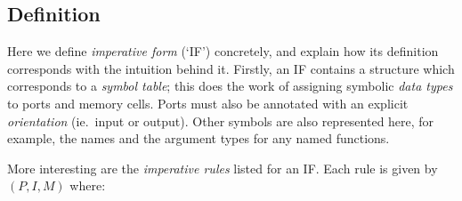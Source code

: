 \subsection{Definition}
\label{sec:imperative_form_definition}
Here we define \textit{imperative form} (`IF') concretely, and explain how its definition corresponds with the intuition behind it. Firstly, an IF contains a structure which corresponds to a \textit{symbol table}; this does the work of assigning symbolic \textit{data types} to ports and memory cells. Ports must also be annotated with an explicit \textit{orientation} (ie.\ input or output). Other symbols are also represented here, for example, the names and the argument types for any named functions.

More interesting are the \textit{imperative rules} listed for an IF. Each rule is given by $(P,I,M)$ where:
